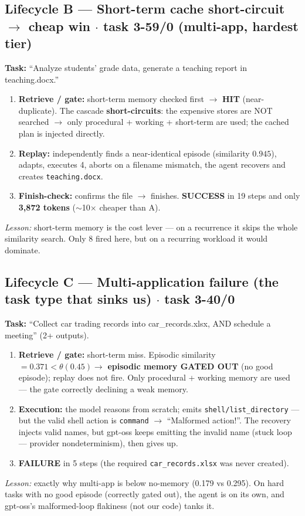 \documentclass[11pt]{article}
\newcommand{\code}[1]{\texttt{#1}}
\newcommand{\cmark}{\textcolor{green!55!black}{\ding{51}}}
\newcommand{\xmark}{\textcolor{red!75!black}{\ding{55}}}
\begin{document}
\subsection*{Lifecycle B --- Short-term cache short-circuit $\to$ cheap win $\cdot$ task 3-59/0 (multi-app, hardest tier) \cmark}
\textbf{Task:} ``Analyze students' grade data, generate a teaching report in teaching.docx.''
\begin{enumerate}[leftmargin=1.5em,itemsep=1pt]
\item \textbf{Retrieve / gate:} short-term memory checked first $\to$ \textbf{HIT} (near-duplicate). The
cascade \textbf{short-circuits}: the expensive stores are NOT searched $\to$ only procedural + working +
short-term are used; the cached plan is injected directly.
\item \textbf{Replay:} independently finds a near-identical episode (similarity $0.945$), adapts, executes
4, aborts on a filename mismatch, the agent recovers and creates \code{teaching.docx}.
\item \textbf{Finish-check:} confirms the file $\to$ finishes. \textbf{SUCCESS} in 19 steps and only
\textbf{3{,}872 tokens} ($\sim$10$\times$ cheaper than A).
\end{enumerate}
\emph{Lesson:} short-term memory is the cost lever --- on a recurrence it skips the whole similarity
search. Only 8 fired here, but on a recurring workload it would dominate.

\subsection*{Lifecycle C --- Multi-application failure (the task type that sinks us) $\cdot$ task 3-40/0 \xmark}
\textbf{Task:} ``Collect car trading records into car\_records.xlsx, AND schedule a meeting'' (2+ outputs).
\begin{enumerate}[leftmargin=1.5em,itemsep=1pt]
\item \textbf{Retrieve / gate:} short-term miss. Episodic similarity $= 0.371 < \theta(0.45) \to$
\textbf{episodic memory GATED OUT} (no good episode); replay does not fire. Only procedural + working
memory are used --- the gate correctly declining a weak memory.
\item \textbf{Execution:} the model reasons from scratch; emits \code{shell/list\_directory} --- but the
valid shell action is \code{command} $\to$ ``Malformed action!''. The recovery injects valid names, but
gpt-oss keeps emitting the invalid name (stuck loop --- provider nondeterminism), then gives up.
\item \textbf{FAILURE} in 5 steps (the required \code{car\_records.xlsx} was never created).
\end{enumerate}
\emph{Lesson:} exactly why multi-app is below no-memory (0.179 vs 0.295). On hard tasks with no good
episode (correctly gated out), the agent is on its own, and gpt-oss's malformed-loop flakiness (not our
code) tanks it.
\end{document}

